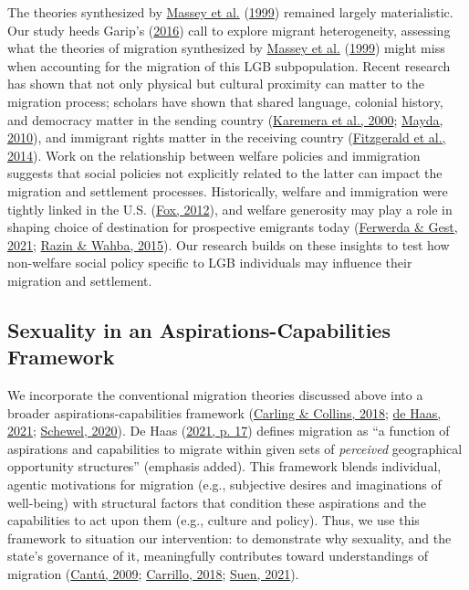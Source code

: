 \documentclass[
  11pt,
]{article}
\begin{document}
The theories synthesized by \protect\hyperlink{ref-massey_1999}{Massey et al.} (\protect\hyperlink{ref-massey_1999}{1999}) remained largely materialistic.
Our study heeds Garip's (\protect\hyperlink{ref-garip_2016}{2016}) call to explore migrant heterogeneity, assessing what the theories of migration synthesized by \protect\hyperlink{ref-massey_1999}{Massey et al.} (\protect\hyperlink{ref-massey_1999}{1999}) might miss when accounting for the migration of this LGB subpopulation. Recent research has shown that not only physical but cultural proximity can matter to the migration process; scholars have shown that shared language, colonial history, and democracy matter in the sending country (\protect\hyperlink{ref-karemera_2000}{Karemera et al., 2000}; \protect\hyperlink{ref-mayda_2010}{Mayda, 2010}), and immigrant rights matter in the receiving country (\protect\hyperlink{ref-fitzgerald_2014}{Fitzgerald et al., 2014}). Work on the relationship between welfare policies and immigration suggests that social policies not explicitly related to the latter can impact the migration and settlement processes. Historically, welfare and immigration were tightly linked in the U.S. (\protect\hyperlink{ref-fox_2012}{Fox, 2012}), and welfare generosity may play a role in shaping choice of destination for prospective emigrants today (\protect\hyperlink{ref-ferwerda_2021_pull}{Ferwerda \& Gest, 2021}; \protect\hyperlink{ref-razin_2015}{Razin \& Wahba, 2015}). Our research builds on these insights to test how non-welfare social policy specific to LGB individuals may influence their migration and settlement.

\hypertarget{sexuality-in-an-aspirations-capabilities-framework}{%
\subsection{Sexuality in an Aspirations-Capabilities Framework}\label{sexuality-in-an-aspirations-capabilities-framework}}

We incorporate the conventional migration theories discussed above into a broader aspirations-capabilities framework (\protect\hyperlink{ref-carling_2018_aspiration}{Carling \& Collins, 2018}; \protect\hyperlink{ref-dehaas_2021}{de Haas, 2021}; \protect\hyperlink{ref-schewel_2020}{Schewel, 2020}).
De Haas (\protect\hyperlink{ref-dehaas_2021}{2021, p. 17}) defines migration as ``a function of aspirations and capabilities to migrate within given sets of \emph{perceived} geographical opportunity structures'' (emphasis added). This framework blends individual, agentic motivations for migration (e.g., subjective desires and imaginations of well-being) with structural factors that condition these aspirations and the capabilities to act upon them (e.g., culture and policy). Thus, we use this framework to situation our intervention: to demonstrate why sexuality, and the state's governance of it, meaningfully contributes toward understandings of migration (\protect\hyperlink{ref-cantu_2009}{Cantú, 2009}; \protect\hyperlink{ref-carrillo_2018}{Carrillo, 2018}; \protect\hyperlink{ref-suen_2021_sexual}{Suen, 2021}).
\end{document}
